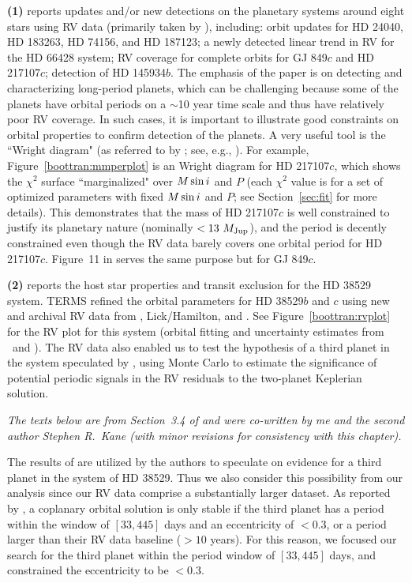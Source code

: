 {\bf (1)} \cite{2015ApJ...800...22F} reports updates and/or new detections on
the planetary systems around eight stars using RV data (primarily
taken by \keck), including: orbit updates for HD 24040, HD 183263, HD
74156, and HD 187123; a newly detected linear trend in RV for the HD
66428 system; RV coverage for complete orbits for GJ 849$c$ and HD
217107$c$; detection of HD 145934$b$. The emphasis of the paper is on
detecting and characterizing long-period planets, which can be
challenging because some of the planets have orbital periods on a $\sim$10
year time scale and thus have relatively poor RV coverage. In such
cases, it is important to illustrate good constraints on orbital
properties to confirm detection of the planets. A very useful tool is
the ``Wright diagram" (as referred to by
\citealt{2014ApJ...785..126K}; see, e.g.,
\citealt{2009ApJ...699L..97W}). For example,
Figure~\ref{boottran:mmperplot} is an Wright diagram for HD 217107$c$,
which shows the $\chi^2$ surface ``marginalized" over $M\sin{i}$ and $P$
(each $\chi^2$ value is for a set of optimized parameters with fixed
$M\sin{i}$ and $P$; see Section~\ref{sec:fit} for more details). This
demonstrates that the mass of HD 217107$c$ is well constrained to
justify its planetary nature (nominally $<13\ M_{\rm Jup}$), and the period
is decently constrained even though the RV data barely covers one
orbital period for HD 217107$c$. Figure~11 in
\cite{2015ApJ...800...22F} serves the same purpose but for GJ 849$c$.

{\bf (2)} \cite{2013ApJ...768..155H} reports the host star properties
and transit exclusion for the HD 38529 system. TERMS refined the
orbital parameters for HD 38529$b$ and $c$ using new and archival RV
data from \hrs, Lick/Hamilton, and \keck. See
Figure~\ref{boottran:rvplot} for the RV plot for this system (orbital
fitting and uncertainty estimates from \rvlin\ and \boottran). The RV
data also enabled us to test the hypothesis of a third planet in the
system speculated by \cite{2010AJ....139.1844B}, using Monte Carlo to
estimate the significance of potential periodic signals in the RV
residuals to the two-planet Keplerian solution.

{\it The texts below are from Section~3.4 of
  \cite{2013ApJ...768..155H} and were co-written by me and the second
  author Stephen R.\ Kane (with minor revisions for consistency with
  this chapter).}

The results of \cite{2010AJ....139.1844B} are utilized by the authors
to speculate on evidence for a third planet in the system of HD
38529. Thus we also consider this possibility from our analysis since
our RV data comprise a substantially larger dataset. As reported by
\cite{2010AJ....139.1844B}, a coplanary orbital solution is only
stable if the third planet has a period within the window of
$[33,445]$ days and an eccentricity of $<0.3$, or a period larger than
their RV data baseline ($>10$ years). For this reason, we focused our
search for the third planet within the period window of $[33,445]$
days, and constrained the eccentricity to be $<0.3$.

